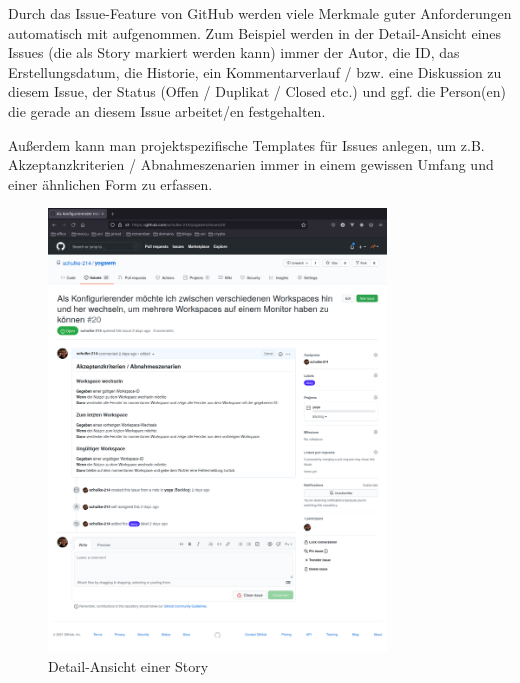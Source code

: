 \documentclass{article}
\begin{document}
Durch das Issue-Feature von GitHub werden viele Merkmale guter Anforderungen automatisch mit aufgenommen. Zum Beispiel werden
in der Detail-Ansicht eines Issues (die als Story markiert werden kann) immer der Autor, die ID, das Erstellungsdatum, die Historie,
ein Kommentarverlauf / bzw. eine Diskussion zu diesem Issue, der Status (Offen / Duplikat / Closed etc.) und ggf. die Person(en) die gerade
an diesem Issue arbeitet/en festgehalten. \par
Außerdem kann man projektspezifische Templates für Issues anlegen, um z.B. Akzeptanzkriterien / Abnahmeszenarien immer in einem
gewissen Umfang und einer ähnlichen Form zu erfassen.

\begin{figure}[H]
	\includegraphics[width=0.8\textwidth]{issue-detail}
	\centering
	\caption{Detail-Ansicht einer Story}
\end{figure}
\end{document}
